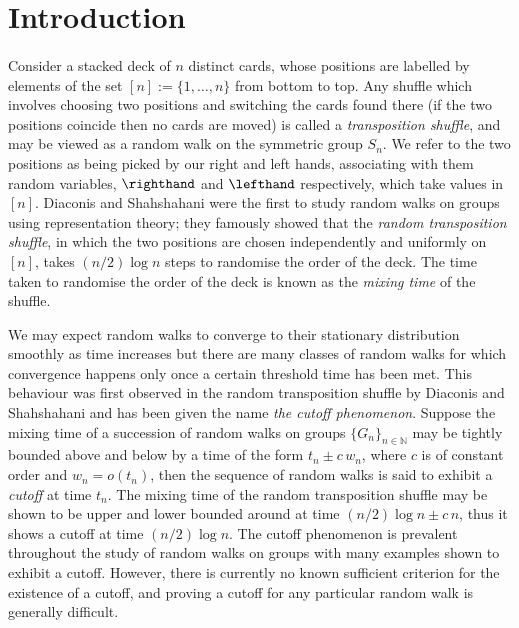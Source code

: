 \documentclass[11pt]{report}
\begin{document}
\newpage
\tableofcontents

\newpage
{}
\listoftables


\newpage
{}
\listoffigures


\newpage
\section*{Introduction}

	

\paragraph{}
Consider a stacked deck of $n$ distinct cards, whose positions are labelled by elements of the set $[n]:=\{1,\dots,n\}$ from bottom to top. Any shuffle 
which involves choosing two positions and switching the cards found there (if the two positions coincide then no cards are 
moved)
is 	called a \emph{transposition shuffle}, and may be viewed as a random walk on the 
symmetric group $S_n$. We refer to the two positions as being picked by our right and left hands, associating with them random variables, $\righthand$ and $\lefthand$ respectively, which take values in $[n]$. Diaconis and Shahshahani \cite{diaconis1981generating} were the 
first to study random walks on groups  using representation theory; they famously showed that the \emph{random transposition shuffle}, 
in which the two positions are chosen independently and uniformly on $[n]$, 
takes $(n/2)\log n$ steps to randomise the order of the deck. The time taken to randomise the order of the deck is known as the \emph{mixing time} of the shuffle. 

We may expect random walks to converge to their stationary distribution smoothly as time increases but there are many classes of random walks for which convergence happens only once a certain threshold time has been met. This behaviour was first observed in the random transposition shuffle by Diaconis and Shahshahani and has been given the name \emph{the cutoff phenomenon}. 
Suppose the mixing time of a succession of random walks on groups $\{G_{n}\}_{n \in \mathbb{N}}$ may be tightly bounded above and below by a time of the form $t_{n} \pm c \,w_{n}$, where $c$ is of constant order and $w_{n} = o(t_{n})$, then the sequence of random walks is said to exhibit a \emph{cutoff} at time $t_{n}$.
The mixing time of the random transposition shuffle may be shown to be upper and lower bounded around at time $(n/2)\log n \pm c\, n$, thus it shows a cutoff at time $(n/2)\log n$. 
The cutoff phenomenon is prevalent throughout the study of random walks on groups with many examples shown to exhibit a cutoff. However,  there is currently no known sufficient criterion for the existence of a cutoff, and proving a cutoff for any particular random walk is generally difficult. 
\end{document}
